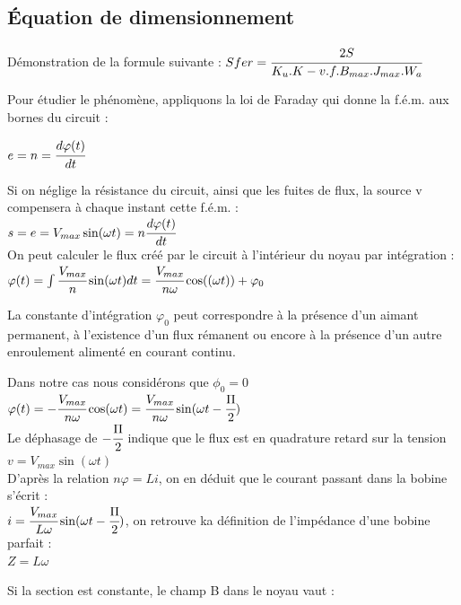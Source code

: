 	

\subsection{Équation de dimensionnement}

Démonstration de la formule suivante : $ Sfer = \cfrac{2S}{K_u.K-v.f.B_{max}.J_{max}.W_a}$


Pour étudier le phénomène, appliquons la loi de Faraday qui donne la f.é.m. aux bornes du circuit : 

$e = n= \cfrac{d\varphi(t)}{dt}$

Si on néglige la résistance du circuit, ainsi que les fuites de flux, la source v compensera à chaque instant cette f.é.m. : \\
$s = e = V_{max}\sin(\omega{}t) = n\cfrac{d\varphi(t)}{dt}$\\


On peut calculer le flux créé par le circuit à l’intérieur du noyau par intégration : \\
$\varphi(t) = \int {\cfrac{V_{max}}{n} \sin(\omega{}t) dt} = \cfrac{V_{max}}{n\omega}\cos((\omega{}t)) + \varphi_0$

La constante d'intégration $\varphi_0$ peut correspondre à la présence d'un aimant permanent, à l’existence d'un flux rémanent ou encore à la présence d'un autre enroulement alimenté en courant continu. 

Dans notre cas nous considérons que $\phi_0 = 0$\\

$\varphi(t) = - \cfrac{V_{max}}{n\omega} \cos(\omega{}t) = \cfrac{V_{max}}{n\omega} \sin(\omega{}t - \cfrac{\Pi}{2})$\\


Le déphasage de $- \cfrac{\Pi}{2}$ indique que le flux est en quadrature retard sur la tension $v =  V_{max}\sin(\omega{}t)$\\

D'après la relation $n\varphi = Li$, on en déduit que le courant passant dans la bobine s'écrit : \\

$i = \cfrac{V_{max}}{L\omega} \sin(\omega{}t - \cfrac{\Pi}{2})$, on retrouve ka définition de l'impédance d'une bobine parfait :\\

$Z = L\omega$


Si la section est constante, le champ B dans le noyau vaut : \\


